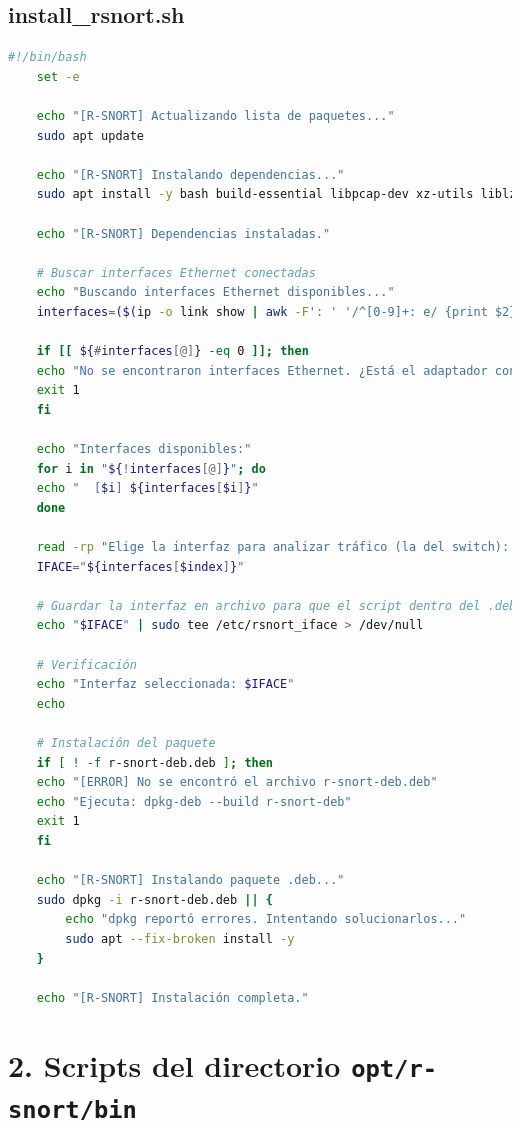 \documentclass[11pt,a4paper,twoside]{report}
\begin{document}
\subsection*{install\_rsnort.sh}
\begin{lstlisting}[language=bash, caption={Script principal \texttt{install\_rsnort.sh}}, label={lst:install-rsnort}]
	#!/bin/bash
	set -e
	
	echo "[R-SNORT] Actualizando lista de paquetes..."
	sudo apt update
	
	echo "[R-SNORT] Instalando dependencias..."
	sudo apt install -y bash build-essential libpcap-dev xz-utils liblzma-dev clamav clamav-daemon
	
	echo "[R-SNORT] Dependencias instaladas."
	
	# Buscar interfaces Ethernet conectadas
	echo "Buscando interfaces Ethernet disponibles..."
	interfaces=($(ip -o link show | awk -F': ' '/^[0-9]+: e/ {print $2}'))
	
	if [[ ${#interfaces[@]} -eq 0 ]]; then
	echo "No se encontraron interfaces Ethernet. ¿Está el adaptador conectado?"
	exit 1
	fi
	
	echo "Interfaces disponibles:"
	for i in "${!interfaces[@]}"; do
	echo "  [$i] ${interfaces[$i]}"
	done
	
	read -rp "Elige la interfaz para analizar tráfico (la del switch): " index
	IFACE="${interfaces[$index]}"
	
	# Guardar la interfaz en archivo para que el script dentro del .deb la use
	echo "$IFACE" | sudo tee /etc/rsnort_iface > /dev/null
	
	# Verificación
	echo "Interfaz seleccionada: $IFACE"
	echo
	
	# Instalación del paquete
	if [ ! -f r-snort-deb.deb ]; then
	echo "[ERROR] No se encontró el archivo r-snort-deb.deb"
	echo "Ejecuta: dpkg-deb --build r-snort-deb"
	exit 1
	fi
	
	echo "[R-SNORT] Instalando paquete .deb..."
	sudo dpkg -i r-snort-deb.deb || {
		echo "dpkg reportó errores. Intentando solucionarlos..."
		sudo apt --fix-broken install -y
	}
	
	echo "[R-SNORT] Instalación completa."
\end{lstlisting}

\section*{2. Scripts del directorio \texttt{opt/r-snort/bin}}
\end{document}
